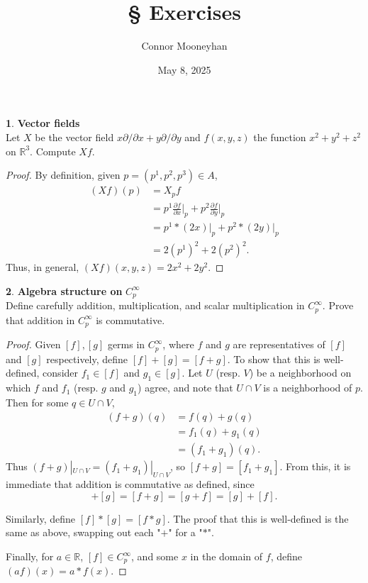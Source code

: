 \documentclass{article}
\title{\S\arabic{section} Exercises}
\author{Connor Mooneyhan}
\date{May 8, 2025}
\theoremstyle{definition}
\newtheorem{ex}{}[section]
\begin{document}
\maketitle

\begin{ex}
	\textbf{Vector fields} \\
	Let $X$ be the vector field $x \partial/\partial x + y \partial/\partial y$ and $f(x, y, z)$ the function $x^2 + y^2 + z^2$ on $\mathbb{R}^3$. Compute $Xf$.
\end{ex}
\begin{proof}
	By definition, given $p = (p^1, p^2, p^3) \in A$, \begin{align*}
		(Xf)(p) & = X_pf                                                                                  \\
		        & = p^1 \frac{\partial f}{\partial x}\bigg|_p + p^2 \frac{\partial f}{\partial y}\bigg|_p \\
		        & = p^1 * (2x)\bigg|_p + p^2 * (2y)\bigg|_p                                               \\
		        & = 2(p^1)^2 + 2(p^2)^2.
	\end{align*}
	Thus, in general, $(Xf)(x, y, z) = 2x^2 + 2y^2$.
\end{proof}

\begin{ex}
	\textbf{Algebra structure on} $C^\infty_p$ \\
	Define carefully addition, multiplication, and scalar multiplication in $C^\infty_p$.
	Prove that addition in $C^\infty_p$ is commutative.
\end{ex}
\begin{proof}
	Given $[f], [g]$ germs in $C^\infty_p$, where $f$ and $g$ are representatives of $[f]$ and $[g]$ respectively, define $[f] + [g] = [f + g]$.
	To show that this is well-defined, consider $f_1 \in [f]$ and $g_1 \in [g]$.
	Let $U$ (resp. $V$) be a neighborhood on which $f$ and $f_1$ (resp. $g$ and $g_1$) agree, and note that $U \cap V$ is a neighborhood of $p$.
	Then for some $q \in U \cap V$, \begin{align*}
		(f + g)(q) & = f(q) + g(q)     \\
		           & = f_1(q) + g_1(q) \\
		           & = (f_1 + g_1)(q).
	\end{align*}
	Thus $(f + g)|_{U \cap V} = (f_1 + g_1)|_{U \cap V}$, so $[f + g] = [f_1 + g_1]$.
	From this, it is immediate that addition is commutative as defined, since \begin{equation*}
		[f] + [g] = [f + g] = [g + f] = [g] + [f].
	\end{equation*}

	Similarly, define $[f] * [g] = [f * g]$.
	The proof that this is well-defined is the same as above, swapping out each "$+$" for a "$*$".

	Finally, for $a \in \mathbb{R}$, $[f] \in C^\infty_p$, and some $x$ in the domain of $f$, define $(af)(x) = a * f(x)$.
\end{proof}
\end{document}
